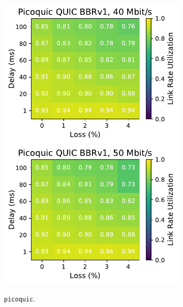 \begin{figure}[ht]
\begin{subfigure}[b]{0.22\linewidth}
        \includegraphics[width=\linewidth,trim={0 0 2cm 0},clip]{splitting/figures/heatmaps/heatmap_picoquic_bbr1_40mbps.pdf}
        \includegraphics[width=\linewidth,trim={0 0 2cm 0},clip]{splitting/figures/heatmaps/heatmap_picoquic_bbr1_50mbps.pdf}
        \caption{\texttt{picoquic}.}
    \end{subfigure}
    \begin{subfigure}[b]{0.89cm}

\end{subfigure}
\end{figure}
